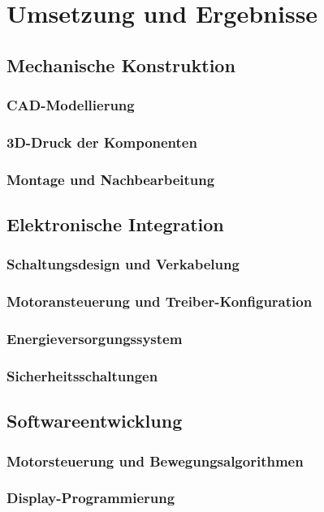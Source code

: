 \chapter{Umsetzung und Ergebnisse}
\label{cha:umsetzung}

\section{Mechanische Konstruktion}
\subsection{CAD-Modellierung}
\subsection{3D-Druck der Komponenten}
\subsection{Montage und Nachbearbeitung}

\section{Elektronische Integration}
\subsection{Schaltungsdesign und Verkabelung}
\subsection{Motoransteuerung und Treiber-Konfiguration}
\subsection{Energieversorgungssystem}
\subsection{Sicherheitsschaltungen}

\section{Softwareentwicklung}
\subsection{Motorsteuerung und Bewegungsalgorithmen}
\subsection{Display-Programmierung}
